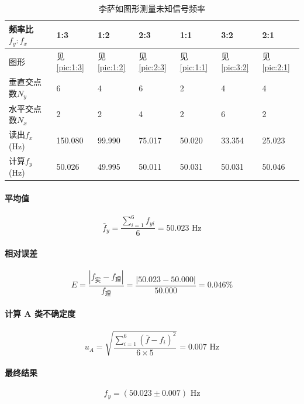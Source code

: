 \documentclass[]{../template/Report}%
\begin{document}
\begin{table}[H]
\centering
\caption{李萨如图形测量未知信号频率}
\label{tab:li_freq}
\begin{tabular}{|L{0.2\textwidth}|L{0.08\textwidth}|L{0.08\textwidth}|L{0.08\textwidth}|L{0.08\textwidth}|L{0.08\textwidth}|L{0.08\textwidth}|}
\hline
频率比$f_y:f_x$ & 1:3     & 1:2     & 2:3    & 1:1    & 3:2    & 2:1    \\ \hline
图形           & 见\cref{pic:1:3}       & 见\cref{pic:1:2}       & 见\cref{pic:2:3}      & 见\cref{pic:1:1}      & 见\cref{pic:3:2}      & 见\cref{pic:2:1}      \\ \hline
垂直交点数$N_y$   & 6       & 4       & 6      & 2      & 4      & 4      \\ \hline
水平交点数$N_x$   & 2       & 2       & 4      & 2      & 6      & 2      \\ \hline
读出$f_x$(\si{\hertz})      & 150.080 & 99.990 & 75.017 & 50.020 & 33.354 & 25.023 \\ \hline
计算$f_y$(\si{\hertz})      & 50.026  & 49.995  & 50.011 & 50.031 & 50.031 & 50.046 \\ \hline
\end{tabular}
\end{table}
\paragraph{平均值}
\begin{equation*}
    \bar{f}_y = \frac{\sum_{i=1}^{6} f_{yi}}{6} = 50.023 \text{ Hz}
\end{equation*}

\paragraph{相对误差}
\begin{equation*}
    E = \frac{|f_{\text{实}} - f_{\text{理}}|}{f_{\text{理}}} = \frac{|50.023 - 50.000|}{50.000} = 0.046\%
\end{equation*}

\paragraph{计算 A 类不确定度}
\begin{equation*}
    u_A = \sqrt{\frac{\sum_{i=1}^{6} (\bar{f} - f_i)^2}{6 \times 5}} = 0.007 \text{ Hz}
\end{equation*}


\paragraph{最终结果}
\begin{equation*}
    f_y = (50.023 \pm 0.007) \text{ Hz}
\end{equation*}
\end{document}

